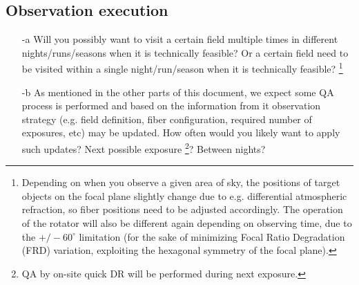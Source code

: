 \documentclass[a4paper,notitlepage]{article}
\newcommand{\colm}[1]{\textcolor{ccolm}{\thesubsubsection-#1}}
\newcommand{\coll}[1]{\textcolor{ccoll}{\thesubsubsection-#1}}
\begin{document}
%
%

\subsection{Observation execution}

\begin{enumerate}
  \item[\coll{a}] Will you possibly want to visit a certain field
           multiple times in different nights/runs/seasons when it
           is technically feasible?
           Or a certain field need to be visited within a single 
           night/run/season when it is technically feasible? 
           \footnote{Depending on when you
           observe a given area of sky, the positions of target
           objects on the focal plane slightly change due to
           e.g. differential atmospheric refraction, so fiber
           positions need to be adjusted accordingly. The operation
           of the rotator will also be different again depending on
           observing time, due to the $+/-60^{\circ}$ limitation
           (for the sake of minimizing Focal Ratio Degradation (FRD)
           variation, exploiting the hexagonal symmetry of the focal
           plane).}
  \item[\coll{b}] As mentioned in the other parts of this document, we
           expect some QA process is performed and based on the
           information from it observation strategy (e.g. field
           definition, fiber configuration, required number of
           exposures, etc) may be updated. How often would you
           likely want to apply such updates? Next possible exposure
           \footnote{QA by on-site quick DR will be performed during next 
           exposure.}?
           Between nights?
\end{enumerate}
\end{document}
